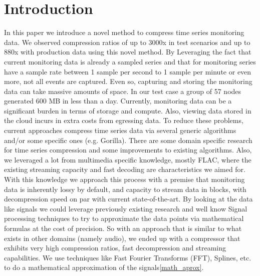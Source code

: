 \documentclass[conference]{IEEEtran}
\begin{document}
\section{Introduction}

In this paper we introduce a novel method to compress time series monitoring data. 
We observed compression ratios of up to 3000x in test scenarios and up to 880x with production data using this novel method.
By Leveraging the fact that current monitoring data is already a sampled series and that for monitoring series have a sample rate between 1 sample per second to 1 sample per minute\cite{monitoring-samples} or even more\cite{microsoft}, not all events are captured.
Even so, capturing and storing the monitoring data can take massive amounts of space. In our test case a group of 57 nodes generated 600 MB in less than a day.
Currently, monitoring data can be a significant burden in terms of storage and compute.
Also, viewing data stored in the cloud incurs in extra costs from egressing data.
To reduce these problems, current approaches compress time series data via several generic algorithms\cite{compression} and/or some specific ones (e.g. Gorilla\cite{gorilla}).
There are some domain specific research for time series compression\cite{nasa-compression}\cite{smartgrid} and some improvements to existing algorithms\cite{victoria}.
Also, we leveraged a lot from multimedia specific knowledge, mostly FLAC\cite{flac}, where the existing streaming capacity and fast decoding are characteristics we aimed for.
With this knowledge we approach this process with a premise that monitoring data is inherently lossy by default, and capacity to stream data in blocks, with decompression speed on par with current state-of-the-art.
By looking at the data like signals we could leverage previously existing research and well know Signal processing techniques to try to approximate the data points via mathematical formulas at the cost of precision.
So with an approach that is similar to what exists in other domains (namely audio), we ended up with a compressor that exhibits very high compression ratios, fast decompression and streaming capabilities.
We use techniques like Fast Fourier Transforms (FFT), Splines, etc. to do a mathematical approximation of the signals\ref{math_aprox}.
\end{document}
